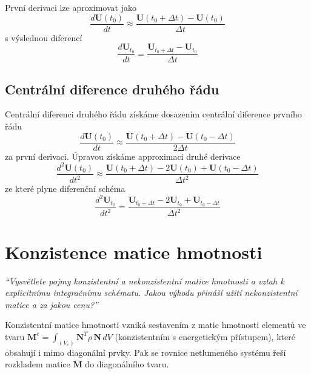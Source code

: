 \documentclass{article}
\begin{document}
\begin{multicols}{2}
	První derivaci lze aproximovat jako
	\begin{equation*}
		\frac{d\bm{U}(t_0)}{dt} \approx \frac{\bm{U}(t_0+\Delta t) - \bm{U}(t_0)}{\Delta t}
	\end{equation*}
	s výslednou diferencí
	\begin{equation*}
		\frac{d\bm{U}_{t_0}}{dt} = \frac{\bm{U}_{t_0+\Delta t} - \bm{U}_{t_0}}{\Delta t}
	\end{equation*}
	
	\subsection{Centrální diference druhého řádu}

	Centrální diferenci druhého řádu získáme dosazením centrální diference prvního řádu
	\begin{equation*}
		\frac{d\bm{U}(t_0)}{dt} \approx \frac{\bm{U}(t_0+\Delta t) - \bm{U}(t_0-\Delta t)}{2\Delta t}
	\end{equation*}
	za první derivaci.
	Úpravou získáme approximaci druhé derivace
	\begin{equation*}
		\frac{d^2\bm{U}(t_0)}{dt^2}
		\approx
		\frac{ \bm{U}(t_0+\Delta t) - 2\bm{U}(t_0) + \bm{U}(t_0-\Delta t) }{\Delta t^2}
	\end{equation*}
	ze které plyne diferenční schéma
	\begin{equation*}
		\frac{d^2\bm{U}_{t_0}}{dt^2}
		=
		\frac{\bm{U}_{t_0+\Delta t} - 2\bm{U}_{t_0} + \bm{U}_{t_0-\Delta t}}{\Delta t^2}
	\end{equation*}

	\section{Konzistence matice hmotnosti}
	\emph{``Vysvětlete pojmy konzistentní a nekonzistentní matice hmotnosti a vztah k explicitnímu integračnímu schématu. Jakou výhodu přináší užití nekonzistentní matice a za jakou cenu?''}

	Konzistentní matice hmotnosti vzniká sestavením z matic hmotnosti elementů ve tvaru $\bm{M}^e = \int_{(V_e)} \bm{N}^T \rho \, \bm{N} \, dV$ (konzistentním s energetickým přístupem), které obsahují i mimo diagonální prvky. Pak se rovnice netlumeného systému řeší rozkladem matice $\bm{M}$ do diagonálního tvaru.


\end{multicols}
\end{document}

